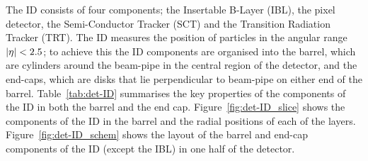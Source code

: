 The ID consists of four components; the Insertable B-Layer (IBL), the pixel detector, %
the Semi-Conductor Tracker (SCT) and the Transition Radiation Tracker (TRT).
The ID measures the position of particles in the angular range $|\eta|\nobreak<\nobreak2.5$;
to achieve this the ID components are organised into the barrel, which are cylinders around the beam-pipe in the central region %
of the detector, and the end-caps, which are disks that lie perpendicular to beam-pipe on either end of the barrel.
Table~\ref{tab:det-ID} summarises the key properties of the components of the ID in both the barrel and the end cap.
Figure~\ref{fig:det-ID_slice} shows the components of the ID in the barrel and the radial positions of each of the layers.
Figure~\ref{fig:det-ID_schem} shows the layout of the barrel and end-cap components of the ID (except the IBL) in one half of the detector.

